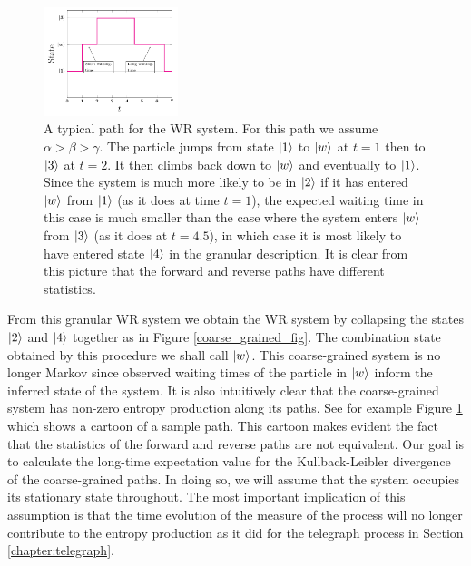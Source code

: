 \begin{figure}
    \centering
    \includegraphics[width = 0.35\textwidth]{figures/waiting_room_sample_path.pdf}
    \caption{ \footnotesize A typical path for the WR system. For this path we assume $\alpha > \beta > \gamma$. The particle jumps from state $\ket{1}$ to $\ket{w}$ at $t = 1$ then to $\ket{3}$ at $t = 2$. It then climbs back down to $\ket{w}$ and eventually to $\ket{1}$. Since the system is much more likely to be in $\ket{2}$ if it has entered $\ket{w}$ from $\ket{1}$ (as it does at time $t = 1$), the expected waiting time in this case is much smaller than the case where the system enters $\ket{w}$ from $\ket{3}$ (as it does at $t = 4.5$), in which case it is most likely to have entered state $\ket{4}$ in the granular description. It is clear from this picture that the forward and reverse paths have different statistics.}
    \label{fig:coarse_grained_sample_path}
\end{figure}

From this granular WR system we obtain the WR system by collapsing the states $\ket{2}$ and $\ket{4}$ together as in Figure \ref{coarse_grained_fig}. The combination state obtained by this procedure we shall call $\ket{w}$. This coarse-grained system is no longer Markov since observed waiting times of the particle in $\ket{w}$ inform the inferred state of the system. It is also intuitively clear that the coarse-grained system has non-zero entropy production along its paths. See for example Figure \ref{fig:coarse_grained_sample_path} which shows a cartoon of a sample path. This cartoon makes evident the fact that the statistics of the forward and reverse paths are not equivalent. Our goal is to calculate the long-time expectation value for the Kullback-Leibler divergence of the coarse-grained paths. In doing so, we will assume that the system occupies its stationary state throughout. The most important implication of this assumption is that the time evolution of the measure of the process will no longer contribute to the entropy production as it did for the telegraph process in Section \ref{chapter:telegraph}. 


